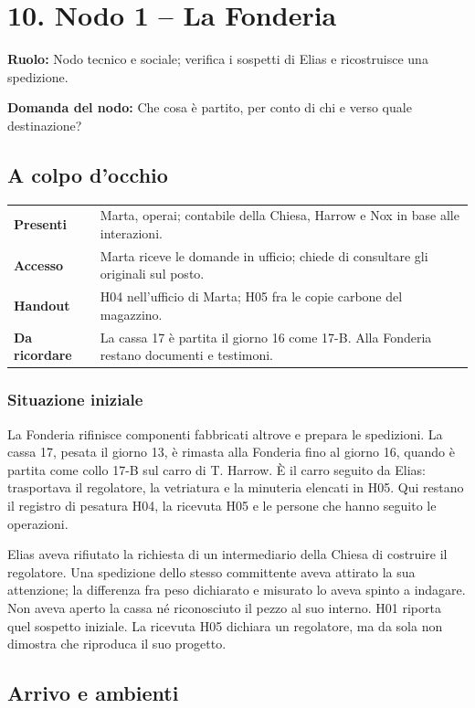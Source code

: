 \documentclass[11pt,a4paper]{article}
\newcommand{\yhdivider}{%
  \par\nobreak\noindent
  \begin{tikzpicture}
    \fill[brass!85] (0,0) -- (0,.7mm) -- (\linewidth,.18mm) -- cycle;
  \end{tikzpicture}\par\nobreak}
\newcommand{\nodehead}[3]{%
\clearpage
{\titleformat{\section}{\displayfont\huge\scshape\color{blood}}{}{0pt}{}[\yhdivider]%
\section{#1}}
\begin{bloodbox}[title={Il nodo al tavolo}]
\textbf{Ruolo:} #2\par\smallskip
\textbf{Domanda del nodo:} #3
\end{bloodbox}}
\begin{document}
\nodehead{10. Nodo 1 -- La Fonderia}{Nodo tecnico e sociale; verifica i sospetti di Elias e ricostruisce una spedizione.}{Che cosa è partito, per conto di chi e verso quale destinazione?}

\subsection{A colpo d'occhio}
\begin{overviewbox}
\begin{tabularx}{\linewidth}{>{\bfseries}p{32mm} X}
Presenti & Marta, operai; contabile della Chiesa, Harrow e Nox in base alle interazioni.\\
Accesso & Marta riceve le domande in ufficio; chiede di consultare gli originali sul posto.\\
Handout & H04 nell'ufficio di Marta; H05 fra le copie carbone del magazzino.\\
Da ricordare & La cassa 17 è partita il giorno 16 come 17-B. Alla Fonderia restano documenti e testimoni.\\
\end{tabularx}
\end{overviewbox}

\subsubsection{Situazione iniziale}
La Fonderia rifinisce componenti fabbricati altrove e prepara le spedizioni. La cassa 17, pesata il giorno 13, è rimasta alla Fonderia fino al giorno 16, quando è partita come collo 17-B sul carro di T. Harrow. È il carro seguito da Elias: trasportava il regolatore, la vetriatura e la minuteria elencati in H05. Qui restano il registro di pesatura H04, la ricevuta H05 e le persone che hanno seguito le operazioni.

Elias aveva rifiutato la richiesta di un intermediario della Chiesa di costruire il regolatore. Una spedizione dello stesso committente aveva attirato la sua attenzione; la differenza fra peso dichiarato e misurato lo aveva spinto a indagare. Non aveva aperto la cassa né riconosciuto il pezzo al suo interno. H01 riporta quel sospetto iniziale. La ricevuta H05 dichiara un regolatore, ma da sola non dimostra che riproduca il suo progetto.

\subsection{Arrivo e ambienti}
\end{document}
